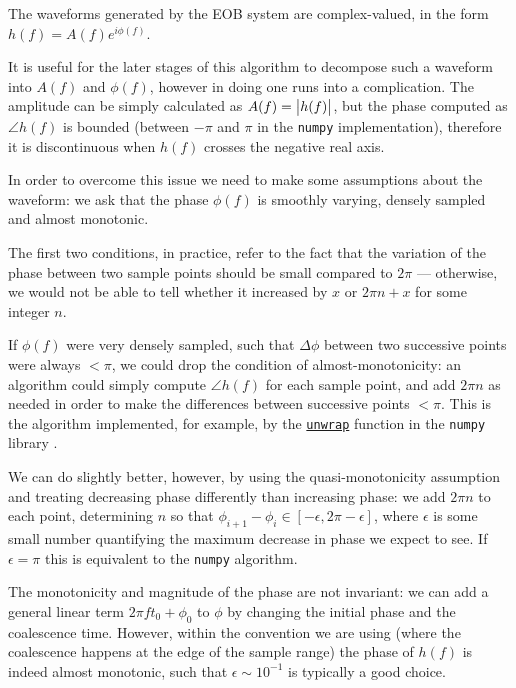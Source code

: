 \documentclass[main.tex]{subfiles}
\begin{document}
The waveforms generated by the \ac{EOB} system are complex-valued, in the form \(h(f) = A(f) e^{i \phi (f)}\).

It is useful for the later stages of this algorithm to decompose such a waveform into \(A(f)\) and \(\phi (f)\), however in doing one runs into a complication.
The amplitude can be simply calculated as \(A(f) = \abs{h(f)}\), but the phase computed as \(\angle h(f)\) is bounded (between \(-\pi \) and \( \pi \) in the \texttt{numpy} implementation), therefore it is discontinuous when \(h(f)\) crosses the negative real axis. 

In order to overcome this issue we need to make some assumptions about the waveform: we ask that the phase \(\phi (f)\) is smoothly varying, densely sampled and almost monotonic. 

The first two conditions, in practice, refer to the fact that the variation of the phase between two sample points should be small compared to \(2 \pi \) --- otherwise, we would not be able to tell whether it increased by \(x\) or \(2 \pi n + x\) for some integer \(n\). 

If \(\phi (f)\) were very densely sampled, such that \(\Delta \phi \) between two successive points were always \(< \pi \), we could drop the condition of almost-monotonicity: an algorithm could simply compute \(\angle h(f)\) for each sample point, and add \(2 \pi n\) as needed in order to make the differences between successive points \(< \pi \). 
This is the algorithm implemented, for example, by the \href{https://numpy.org/doc/stable/reference/generated/numpy.unwrap.html}{\texttt{unwrap}} function in the \texttt{numpy} library \cite{harrisArrayProgrammingNumPy2020}.

We can do slightly better, however, by using the quasi-monotonicity assumption and treating decreasing phase differently than increasing phase: we add \(2 \pi n\) to each point, determining \(n\) so that \(\phi _{i+1} - \phi _i \in [- \epsilon , 2 \pi - \epsilon ]\), where \(\epsilon \) is some small number quantifying the maximum decrease in phase we expect to see.
If \(\epsilon = \pi \) this is equivalent to the \texttt{numpy} algorithm. 

The monotonicity and magnitude of the phase are not invariant: we can add a general linear term \(2 \pi f t_0 + \phi_0 \) to \(\phi \) by changing the initial phase and the coalescence time. 
However, within the convention we are using (where the coalescence happens at the edge of the sample range) the phase of \(h(f)\) is indeed almost monotonic, such that \(\epsilon \sim 10^{-1}\) is typically a good choice.
\end{document}
